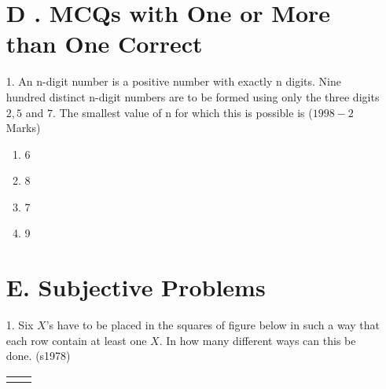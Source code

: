 \documentclass[journal,12pt,twocolumn]{IEEEtran}
\theoremstyle{remark}
\begin{document}
\begin{enumerate}[start=3]
\section*{D . MCQs with One or More than One Correct}
\item[1.] An n-digit number is a positive number with exactly n digits. Nine hundred distinct n-digit numbers are to be formed using only the three digits$2,5$ and $7$. The smallest value of n for which  this is possible is
\hfill{($1998-2$ Marks)}\\
\begin{multicols}{2} 
\begin{enumerate}
\item 6\item  8\columnbreak\item 7\item 9\\
\end{enumerate}
\end{multicols}
 \section*{E. Subjective Problems}   
\item[1.]Six $X$'s have to be placed in the squares of figure below in such a way that each row contain at least one $X$. In how many different ways can this be done.
\hfill{(s1978)}\\
\begin{center}
\begin{tabular}{|c|c|}
\hline
\quad&\quad  \\
\end{tabular}
\end{center}
\begin{center}
\begin{tabular}{|c|c|c|c|}
\hline
    \quad&\quad&\quad &\quad\\
    \hline
\end{tabular}
\end{center}
\begin{center}
\begin{tabular}{|c|c|}
   \quad& \quad\\
   \hline
\end{tabular}\\
\end{center}
\end{enumerate}
\end{document}
